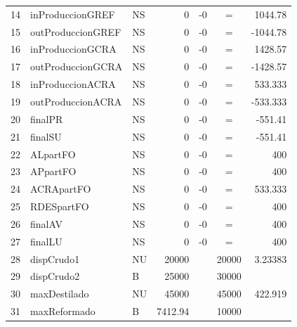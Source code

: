\documentclass[a4paper,10pt]{article}
\begin{document}
\begin{flushleft}
\begin{tabular}{| l  l  l  r  r  c  r |}
     14 &   inProduccionGREF &       NS &               0 &              -0 &               = &         1044.78 \\ 
     15 &   outProduccionGREF &    NS &               0 &              -0 &               = &           -1044.78 \\ 
     16 &   inProduccionGCRA &       NS &               0 &              -0 &               = &         1428.57 \\ 
     17 &   outProduccionGCRA &    NS &               0 &              -0 &               = &           -1428.57 \\ 
     18 &   inProduccionACRA &       NS &               0 &              -0 &               = &         533.333 \\ 
     19 &   outProduccionACRA &    NS &               0 &              -0 &               = &           -533.333 \\ 
     20 &   finalPR &        NS &               0 &              -0 &               = &         -551.41 \\ 
     21 &   finalSU &        NS &               0 &              -0 &               = &         -551.41 \\ 
     22 &   ALpartFO &       NS &               0 &              -0 &               = &             400 \\ 
     23 &   APpartFO &       NS &               0 &              -0 &               = &             400 \\ 
     24 &   ACRApartFO &     NS &               0 &              -0 &               = &         533.333 \\ 
     25 &   RDESpartFO &     NS &               0 &              -0 &               = &             400 \\ 
     26 &   finalAV &        NS &               0 &              -0 &               = &             400 \\ 
     27 &   finalLU &        NS &               0 &              -0 &               = &             400 \\ \hline        
     28 &   dispCrudo1 &     NU &           20000 &                 &        20000   &         3.23383 \\ 
     29 &   dispCrudo2 &     B &            25000 &                &         30000   &  			\\ 
     30 &   maxDestilado &   NU &           45000 &                 &        45000   &         422.919 \\ 
     31 &   maxReformado &         B &          7412.94 &                  &       10000   &  			\\ 

\end{tabular}
\end{flushleft}
\end{document}
